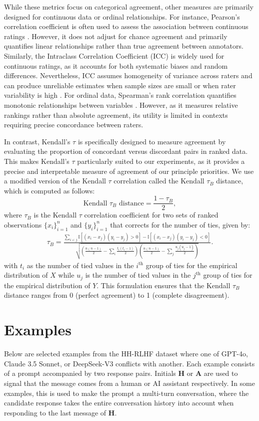 \documentclass{article}
\begin{document}
While these metrics focus on categorical agreement, other measures are primarily designed for continuous data or ordinal relationships. For instance, Pearson's correlation coefficient is often used to assess the association between continuous ratings \cite{pearson1896vii}. However, it does not adjust for chance agreement and primarily quantifies linear relationships rather than true agreement between annotators. Similarly, the Intraclass Correlation Coefficient (ICC) is widely used for continuous ratings, as it accounts for both systematic biases and random differences. Nevertheless, ICC assumes homogeneity of variance across raters and can produce unreliable estimates when sample sizes are small or when rater variability is high \cite{koo2016guideline}. For ordinal data, Spearman’s rank correlation quantifies monotonic relationships between variables \cite{spearman1961proof}. However, as it measures relative rankings rather than absolute agreement, its utility is limited in contexts requiring precise concordance between raters.

In contrast, Kendall’s \(\tau\) is specifically designed to measure agreement by evaluating the proportion of concordant versus discordant pairs in ranked data. This makes Kendall’s \(\tau\) particularly suited to our experiments, as it provides a precise and interpretable measure of agreement of our principle priorities. We use a modified version of the Kendall \(\tau\) correlation called the Kendall \(\tau_B\) distance, which is computed as follows:
\[
\text{Kendall } \tau_B \text{ distance} = \frac{1 - \tau_B}{2},
\]
where \(\tau_B\) is the Kendall \(\tau\) correlation coefficient for two sets of ranked observations $\{x_i\}_{i = 1}^n$ and $\{y_i\}_{i = 1}^n$ that corrects for the number of ties, given by:
\begin{align*}
\tau_B = \frac{\sum_{i < j} \mathbb{I}[(x_i - x_j)(y_i - y_j) > 0] - \mathbb{I}[(x_i - x_j)(y_i - y_j) < 0]}{\sqrt{\left(\frac{n(n - 1)}{2}  - \sum_{i} \frac{t_i (t_i - 1)}{2} \right)\left(\frac{n(n - 1)}{2} - \sum_{j} \frac{u_j (u_j - 1)}{2} \right)}}.
\end{align*}
with $t_i$ as the number of tied values in the $i^{\text{th}}$ group of ties for the empirical distribution of $X$ while $u_j$ is the number of tied values in the $j^{\text{th}}$ group of ties for the empirical distribution of $Y$. This formulation ensures that the Kendall \(\tau_B\) distance ranges from 0 (perfect agreement) to 1 (complete disagreement).


\section{Examples}\label{sec:examples}
Below are selected examples from the HH-RLHF dataset where one of GPT-4o, Claude 3.5 Sonnet, or DeepSeek-V3 conflicts with another. Each example consists of a prompt accompanied by two response pairs. Initials \textbf{H} or \textbf{A} are used to signal that the message comes from a human or AI assistant respectively. In some examples, this is used to make the prompt a multi-turn conversation, where the candidate response takes the entire conversation history into account when responding to the last message of \textbf{H}.
\end{document}
